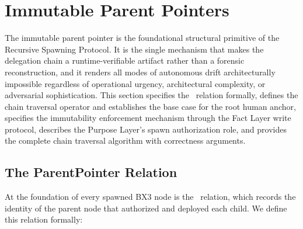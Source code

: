 \section{Immutable Parent Pointers}
\label{sec:immutable-parent-pointers}

The immutable parent pointer is the foundational structural primitive of the Recursive Spawning Protocol. It is the single mechanism that makes the delegation chain a runtime-verifiable artifact rather than a forensic reconstruction, and it renders all modes of autonomous drift architecturally impossible regardless of operational urgency, architectural complexity, or adversarial sophistication. This section specifies the \ParentPointer\ relation formally, defines the chain traversal operator and establishes the base case for the root human anchor, specifies the immutability enforcement mechanism through the Fact Layer write protocol, describes the Purpose Layer's spawn authorization role, and provides the complete chain traversal algorithm with correctness arguments.

\subsection{The ParentPointer Relation}

At the foundation of every spawned BX3 node is the \ParentPointer\ relation, which records the identity of the parent node that authorized and deployed each child. We define this relation formally:

